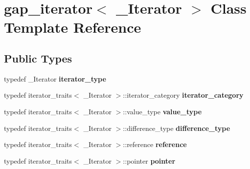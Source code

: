 \hypertarget{classgap__iterator}{}\section{gap\+\_\+iterator$<$ \+\_\+\+Iterator $>$ Class Template Reference}
\label{classgap__iterator}
\subsection*{Public Types}
\begin{DoxyCompactItemize}
\item 
\mbox{\label{classgap__iterator_ab3413575d9f12b63f8357a6e7e1aa61b}} 
typedef \+\_\+\+Iterator {\bfseries iterator\+\_\+type}
\item 
\mbox{\label{classgap__iterator_a7c56def17d794e51f0ad65dbbd21b317}} 
typedef iterator\+\_\+traits$<$ \+\_\+\+Iterator $>$\+::iterator\+\_\+category {\bfseries iterator\+\_\+category}
\item 
\mbox{\label{classgap__iterator_a82b1d53f3c8681e7a23d5dce07c3b18a}} 
typedef iterator\+\_\+traits$<$ \+\_\+\+Iterator $>$\+::value\+\_\+type {\bfseries value\+\_\+type}
\item 
\mbox{\label{classgap__iterator_ad74df5a5907432caf38246330f0a712a}} 
typedef iterator\+\_\+traits$<$ \+\_\+\+Iterator $>$\+::difference\+\_\+type {\bfseries difference\+\_\+type}
\item 
\mbox{\label{classgap__iterator_a39911c9906d44a72e9cb6cb00fbed068}} 
typedef iterator\+\_\+traits$<$ \+\_\+\+Iterator $>$\+::reference {\bfseries reference}
\item 
\mbox{\label{classgap__iterator_af8bc18a995bbb5ec71bbbe8abdda2ce1}} 
typedef iterator\+\_\+traits$<$ \+\_\+\+Iterator $>$\+::pointer {\bfseries pointer}
\end{DoxyCompactItemize}
